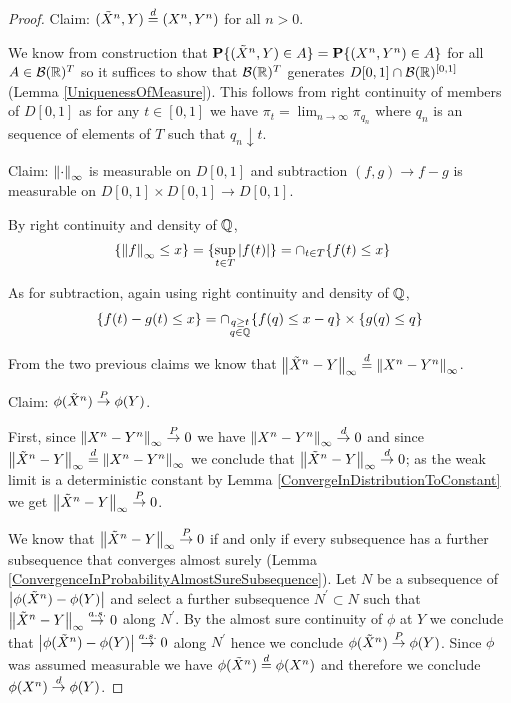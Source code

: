 \begin{proof}
Claim: $(\tilde{X}^n, Y) \overset{d}= (X^n, Y^n)$ for all $n > 0$.

We know from construction that $\textbf{P}\{(\tilde{X}^n, Y) \in A\} =
\textbf{P}\{(X^n,Y^n) \in A\}$ for all $A \in \mathcal{B}(\mathbb{R})^T$
so it suffices to show that $\mathcal{B}(\mathbb{R})^T$ generates $D[0,1]
\cap \mathcal{B}(\mathbb{R})^{[0,1]}$ (Lemma \ref{UniquenessOfMeasure}).
This follows from right continuity of members of $D[0,1]$ as for any
$t \in [0,1]$ we have $\pi_t =\lim_{n \to \infty} \pi_{q_n}$ where
$q_n$ is an sequence of elements of $T$ such that $q_n \downarrow t$.

Claim: $\left \lVert \cdot \right \rVert_\infty$ is measurable on $D[0,1]$ and
subtraction $(f,g) \to f - g$ is measurable on $D[0,1] \times D[0,1]
\to D[0,1]$.

By right continuity and density of $\mathbb{Q}$, 
\begin{align*}
\lbrace \left \lVert f \right \rVert_\infty \leq x \rbrace &= \lbrace \sup_{t \in T}
\left \vert f(t) \right \vert \rbrace = \cap_{t \in T} \lbrace f(t) \leq x \rbrace
\end{align*}

As for subtraction, again using right continuity and density of
$\mathbb{Q}$,
\begin{align*}
\lbrace f(t) - g(t) \leq x \rbrace = \cap_{\substack{q \geq t \\ q \in
    \mathbb{Q}}} \lbrace f(q) \leq x - q \rbrace \times \lbrace g(q) \leq q \rbrace
\end{align*}

From the two previous claims we know that $\left \lVert \tilde{X}^n -
  Y \right \rVert_\infty \overset{d}= \left \lVert X^n - Y^n \right \rVert_\infty$.

Claim: $\phi(\tilde{X}^n) \overset{P}\to \phi(Y)$.

First, since $\left \lVert X^n - Y^n \right \rVert_\infty \overset{P}\to 0$ we have  $\left \lVert X^n -
  Y^n \right \rVert_\infty \overset{d}\to 0$ and since $\left \lVert \tilde{X}^n -
  Y \right \rVert_\infty \overset{d}= \left \lVert X^n - Y^n \right \rVert_\infty$ we conclude that $\left \lVert \tilde{X}^n -
  Y \right \rVert_\infty \overset{d}\to 0$; as the weak limit is a deterministic constant by Lemma
\ref{ConvergeInDistributionToConstant} we get $\left \lVert \tilde{X}^n -
  Y \right \rVert_\infty \overset{P}\to 0$.

We know that $\left \lVert \tilde{X}^n -  Y \right \rVert_\infty \overset{P}\to 0$ if and only if
every subsequence has a further subsequence that converges almost
surely (Lemma \ref{ConvergenceInProbabilityAlmostSureSubsequence}).
Let $N$ be a subsequence of $\left \vert \phi(\tilde{X}^n) - \phi(Y) \right \vert$ and
select a further subsequence $N^\prime \subset N$ such that
$\left \lVert \tilde{X}^n - Y \right \rVert_\infty \overset{a.s.}\to 0$ along $N^\prime$.  By the
almost sure continuity of $\phi$ at $Y$ we conclude that
$\left \vert \phi(\tilde{X}^n) - \phi(Y) \right \vert \overset{a.s.}\to 0$ along $N^\prime$ hence we
conclude $\phi(\tilde{X}^n) \overset{P}\to \phi(Y)$.  Since $\phi$ was
assumed measurable we have $\phi(\tilde{X}^n) \overset{d}= \phi(X^n)$ and
therefore we conclude $\phi(X^n) \overset{d}\to \phi(Y)$.
\end{proof}

